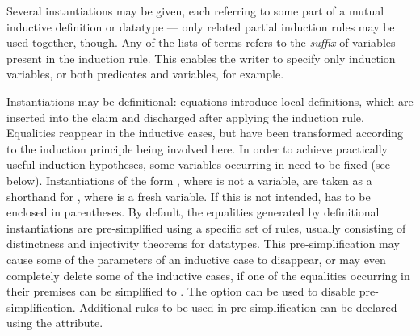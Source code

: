 \begin{isabellebody}
\begin{isamarkuptext}
\begin{description}
  Several instantiations may be given, each referring to some part of
  a mutual inductive definition or datatype --- only related partial
  induction rules may be used together, though.  Any of the lists of
  terms  refers to the \emph{suffix} of variables
  present in the induction rule.  This enables the writer to specify
  only induction variables, or both predicates and variables, for
  example.

  Instantiations may be definitional: equations 
  introduce local definitions, which are inserted into the claim and
  discharged after applying the induction rule.  Equalities reappear
  in the inductive cases, but have been transformed according to the
  induction principle being involved here.  In order to achieve
  practically useful induction hypotheses, some variables occurring in
   need to be fixed (see below).  Instantiations of the form
  , where  is not a variable, are taken as a
  shorthand for \mbox{}, where  is a fresh
  variable. If this is not intended,  has to be enclosed in
  parentheses.  By default, the equalities generated by definitional
  instantiations are pre-simplified using a specific set of rules,
  usually consisting of distinctness and injectivity theorems for
  datatypes. This pre-simplification may cause some of the parameters
  of an inductive case to disappear, or may even completely delete
  some of the inductive cases, if one of the equalities occurring in
  their premises can be simplified to .  The  option can be used to disable pre-simplification.
  Additional rules to be used in pre-simplification can be declared
  using the \hypertarget{attribute.induct-simp}{\hyperlink{attribute.induct-simp}{\mbox{}}} attribute.


\end{description}
\end{isamarkuptext}
\end{isabellebody}
